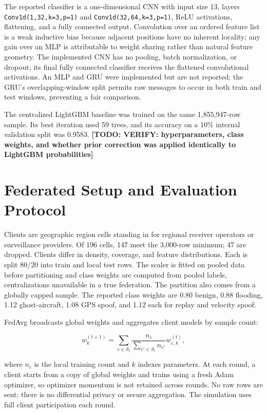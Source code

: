 \documentclass[conference]{IEEEtran}
\newcommand{\todo}[1]{\textbf{[TODO: #1]}}
\begin{document}
The reported classifier is a one-dimensional CNN with input size 13, layers \texttt{Conv1d(1,32,k=3,p=1)} and \texttt{Conv1d(32,64,k=3,p=1)}, ReLU activations, flattening, and a fully connected output. Convolution over an ordered feature list is a weak inductive bias because adjacent positions have no inherent locality; any gain over an MLP is attributable to weight sharing rather than natural feature geometry. The implemented CNN has no pooling, batch normalization, or dropout; its final fully connected classifier receives the flattened convolutional activations. An MLP and GRU were implemented but are not reported; the GRU's overlapping-window split permits raw messages to occur in both train and test windows, preventing a fair comparison.

The centralized LightGBM baseline was trained on the same 1,855,947-row sample. Its best iteration used 59 trees, and its accuracy on a 10\% internal validation split was 0.9583. \todo{VERIFY: hyperparameters, class weights, and whether prior correction was applied identically to LightGBM probabilities}



\section{Federated Setup and Evaluation Protocol}

Clients are geographic region cells standing in for regional receiver operators or surveillance providers. Of 196 cells, 147 meet the 3,000-row minimum; 47 are dropped. Clients differ in density, coverage, and feature distributions. Each is split 80/20 into train and local test rows. The scaler is fitted on pooled data before partitioning and class weights are computed from pooled labels, centralizations unavailable in a true federation. The partition also comes from a globally capped sample. The reported class weights are 0.80 benign, 0.88 flooding, 1.12 ghost-aircraft, 1.08 GPS spoof, and 1.12 each for replay and velocity spoof.



FedAvg broadcasts global weights and aggregates client models by sample count:

\begin{equation}w^{(t+1)}_k=\sum_{c\in S_t}\frac{n_c}{\sum_{c'\in S_t}n_{c'}}w^{(t)}_{c,k},\end{equation}

where $n_c$ is the local training count and $k$ indexes parameters. At each round, a client starts from a copy of global weights and trains using a fresh Adam optimizer, so optimizer momentum is not retained across rounds. No raw rows are sent; there is no differential privacy or secure aggregation. The simulation uses full client participation each round.
\end{document}
